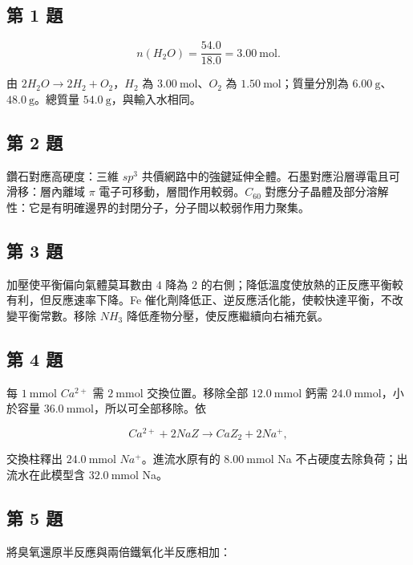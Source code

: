 \documentclass[11pt,a4paper]{article}
\begin{document}
\subsection{第 1 題}\label{ux7b2c-1-ux984c}

\[
n(H_2O)=\frac{54.0}{18.0}=3.00\ \mathrm{mol}.
\]

由 \(2H_2O\rightarrow2H_2+O_2\)，\(H_2\) 為 \(3.00\ \mathrm{mol}\)、\(O_2\) 為 \(1.50\ \mathrm{mol}\)；質量分別為 \(6.00\ \mathrm{g}\)、\(48.0\ \mathrm{g}\)。總質量 \(54.0\ \mathrm{g}\)，與輸入水相同。

\subsection{第 2 題}\label{ux7b2c-2-ux984c}

鑽石對應高硬度：三維 \(sp^3\) 共價網路中的強鍵延伸全體。石墨對應沿層導電且可滑移：層內離域 \(\pi\) 電子可移動，層間作用較弱。\(C_{60}\) 對應分子晶體及部分溶解性：它是有明確邊界的封閉分子，分子間以較弱作用力聚集。

\subsection{第 3 題}\label{ux7b2c-3-ux984c}

加壓使平衡偏向氣體莫耳數由 \(4\) 降為 \(2\) 的右側；降低溫度使放熱的正反應平衡較有利，但反應速率下降。Fe 催化劑降低正、逆反應活化能，使較快達平衡，不改變平衡常數。移除 \(NH_3\) 降低產物分壓，使反應繼續向右補充氨。

\subsection{第 4 題}\label{ux7b2c-4-ux984c}

每 \(1\ \mathrm{mmol}\) \(Ca^{2+}\) 需 \(2\ \mathrm{mmol}\) 交換位置。移除全部 \(12.0\ \mathrm{mmol}\) 鈣需 \(24.0\ \mathrm{mmol}\)，小於容量 \(36.0\ \mathrm{mmol}\)，所以可全部移除。依

\[
Ca^{2+}+2NaZ\rightarrow CaZ_2+2Na^+,
\]

交換柱釋出 \(24.0\ \mathrm{mmol}\) \(Na^+\)。進流水原有的 \(8.00\ \mathrm{mmol}\) Na 不占硬度去除負荷；出流水在此模型含 \(32.0\ \mathrm{mmol}\) Na。

\subsection{第 5 題}\label{ux7b2c-5-ux984c}

將臭氧還原半反應與兩倍鐵氧化半反應相加：
\end{document}
